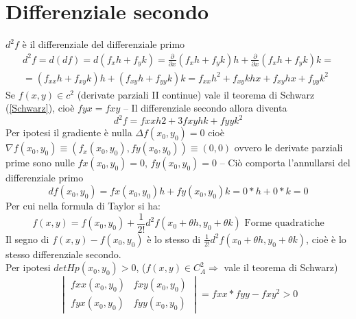\section{Differenziale secondo}
\begin{defi}
	$d^2f$ è il differenziale del differenziale primo
        \begin{equation*}
                \begin{matrix}
                        d^2f=d(df)= d(f_xh+f_yk)=\frac{\partial}{\partial x} (f_xh+f_yk)h+ 
                        \frac{\partial}{\partial x}(f_xh+f_yk)k=\\
                        =(f_{xx}h+f_{xy}k)h+ (f_{xy}h+f_{yy}k)k=f_{xx}h^2+f_{xy}k hx+ f_{xy}
                        hx+f_{yy} k^2
                \end{matrix}
         \end{equation*}
         Se $f(x,y)\in c^2$ (derivate parziali II continue) vale il teorema di Schwarz
         (\ref{Schwarz}), cioè $fyx=fxy$ -- Il differenziale secondo allora diventa
         \begin{equation*}
           d^2f=fxxh2+3fxy hk + fyy k^2
         \end{equation*}
         Per ipotesi il gradiente è nulla $\Delta f(x_0,y_0)=0$ cioè $\nabla f(x_0,y_0)\equiv (f_x(x_0,y_0),fy(x_0,y_0))\equiv (0,0)$ ovvero le derivate parziali prime sono nulle
         $fx(x_0,y_0)=0$, $fy(x_0,y_0)=0$ -- Ciò comporta l'annullarsi del differenziale primo
         \begin{equation*}
           df(x_0, y_0)=fx(x_0,y_0)h+fy(x_0,y_0)k=0*h+0*k=0
         \end{equation*}
         Per cui nella formula di Taylor si ha:
         \begin{equation*}
           f(x,y)=f(x_0,y_0)+\frac{1}{2!}d^2f(x_0+\theta h, y_0+\theta k) \text{ Forme quadratiche}
         \end{equation*}
         Il segno di $f(x,y)-f(x_0,y_0)$ è lo stesso di $\frac{1}{2!}d^2f(x_0+\theta h,
         y_0+\theta k)$, cioè è lo stesso differenziale secondo.\\
         Per ipotesi $det Hp(x_0,y_0)>0$, ($f(x,y)\in C_A^2\Rightarrow$ vale il teorema di Schwarz)
         \begin{equation*}
           \begin{vmatrix}
             fxx(x_0,y_0) & fxy(x_0,y_0) \\
             fyx(x_0,y_0) & fyy(x_0,y_0) 
           \end{vmatrix}= fxx*fyy-fxy^2>0

\end{equation*}
\end{defi}
